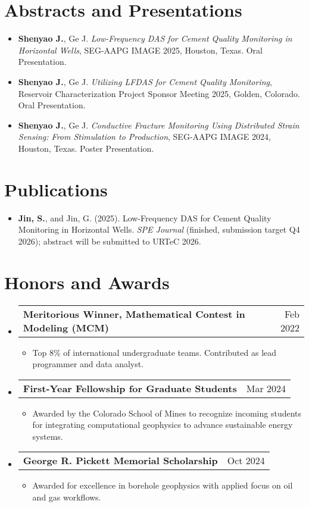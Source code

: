 \documentclass[letterpaper,13pt]{article}
\makeatletter
\newcommand{\resumeItem}[1]{\item\small{{#1 \vspace{-2pt}}}}
\newcommand{\resumeProjectHeading}[2]{
    \item
    \begin{tabular*}{0.97\textwidth}{l@{\extracolsep{\fill}}r}
      \small#1 & #2 \\
    \end{tabular*}\vspace{-7pt}
}
\newcommand{\resumeItemListStart}{\begin{itemize}[label={\small$\bullet$}]}
\newcommand{\resumeItemListEnd}{\end{itemize}\vspace{-5pt}}
\newcommand{\resumeSubHeadingListStart}{\begin{itemize}[leftmargin=0.15in, label={}]}
\newcommand{\resumeSubHeadingListEnd}{\end{itemize}}
\makeatother
\begin{document}
\section{Abstracts and Presentations}
\resumeSubHeadingListStart
  \resumeItem{\textbf{Shenyao J.}, Ge J. \textit{Low-Frequency DAS for Cement Quality Monitoring in Horizontal Wells}, SEG-AAPG IMAGE 2025, Houston, Texas. Oral Presentation.}
  \resumeItem{\textbf{Shenyao J.}, Ge J. \textit{Utilizing LFDAS for Cement Quality Monitoring}, Reservoir Characterization Project Sponsor Meeting 2025, Golden, Colorado. Oral Presentation.}
  \resumeItem{\textbf{Shenyao J.}, Ge J. \textit{Conductive Fracture Monitoring Using Distributed Strain Sensing: From Stimulation to Production}, SEG-AAPG IMAGE 2024, Houston, Texas. Poster Presentation.}
\resumeSubHeadingListEnd



\section{Publications}
\resumeSubHeadingListStart
  \resumeItem{\textbf{Jin, S.}, and Jin, G. (2025). Low-Frequency DAS for Cement Quality Monitoring in Horizontal Wells. \textit{SPE Journal} (finished, submission target Q4 2026); abstract will be submitted to URTeC 2026.}
\resumeSubHeadingListEnd


\section{Honors and Awards}
\resumeSubHeadingListStart

\resumeProjectHeading
  {\textbf{Meritorious Winner, Mathematical Contest in Modeling (MCM)}}{Feb 2022}
\resumeItemListStart
  \resumeItem{Top 8\% of international undergraduate teams. Contributed as lead programmer and data analyst.}
\resumeItemListEnd

\resumeProjectHeading
  {\textbf{First-Year Fellowship for Graduate Students}}{Mar 2024}
\resumeItemListStart
  \resumeItem{Awarded by the Colorado School of Mines to recognize incoming students for integrating computational geophysics to advance sustainable energy systems.}
\resumeItemListEnd

\resumeProjectHeading
  {\textbf{George R. Pickett Memorial Scholarship}}{Oct 2024}
\resumeItemListStart
  \resumeItem{Awarded for excellence in borehole geophysics with applied focus on oil and gas workflows.}
\resumeItemListEnd

\resumeSubHeadingListEnd
\end{document}
